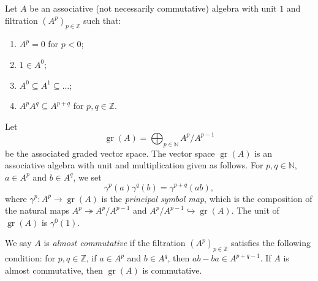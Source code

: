 \documentclass[a4paper, 12pt, reqno]{amsart}
\theoremstyle{remark}
\DeclareMathOperator{\gr}{gr}
\begin{document}
Let $A$ be an associative (not necessarily commutative) algebra with unit $1$ and filtration $(A^p)_{p \in \mathbb{Z}}$ such that:
\begin{enumerate}
\item $A^p = 0$ for $p < 0$;
\item $1 \in A^0$;
\item $A^0 \subseteq A^1 \subseteq \dots$;
\item $A^pA^q \subseteq A^{p + q}$ for $p, q \in \mathbb{Z}$.
\end{enumerate}
Let
\begin{equation*}
  \gr(A) = \bigoplus_{p \in \mathbb{N}}A^p/A^{p - 1}
\end{equation*}
be the associated graded vector space.
The vector space $\gr(A)$ is an associative algebra with unit and multiplication given as follows.
For $p, q \in \mathbb{N}$, $a \in A^p$ and $b \in A^q$, we set
\begin{equation*}
  \gamma^p(a)\gamma^q(b) = \gamma^{p + q}(ab),
\end{equation*}
where $\gamma^p: A^p \to \gr(A)$ is the \emph{principal symbol map}, which is the composition of the natural maps $A^p \twoheadrightarrow A^p/A^{p - 1}$ and $A^p/A^{p - 1} \hookrightarrow \gr(A)$.
The unit of $\gr(A)$ is $\gamma^0(1)$.

We say $A$ is \emph{almost commutative} if the filtration $(A^p)_{p \in \mathbb{Z}}$ satisfies the following condition: for $p, q \in \mathbb{Z}$, if $a \in A^p$ and $b \in A^q$, then $ab - ba \in A^{p + q - 1}$.
If $A$ is almost commutative, then $\gr(A)$ is commutative.
\end{document}
